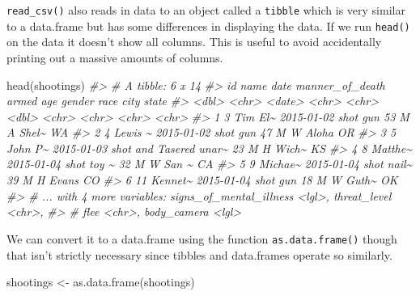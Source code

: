 \documentclass[
]{krantz}
\makeatletter
\newenvironment{Shaded}{\begin{snugshade}}{\end{snugshade}}
\newcommand{\CommentTok}[1]{\textcolor[rgb]{0.37,0.37,0.37}{\textit{#1}}}
\newcommand{\FunctionTok}[1]{\textcolor[rgb]{0,0,0}{#1}}
\newcommand{\NormalTok}[1]{#1}
\newcommand{\OtherTok}[1]{\textcolor[rgb]{0.37,0.37,0.37}{#1}}
\newenvironment{kframe}{%
\medskip{}
\setlength{\fboxsep}{.8em}
 \def\at@end@of@kframe{}%
 \ifinner\ifhmode%
  \def\at@end@of@kframe{\end{minipage}}%
  \begin{minipage}{\columnwidth}%
 \fi\fi%
 \def\FrameCommand##1{\hskip\@totalleftmargin \hskip-\fboxsep
 \colorbox{shadecolor}{##1}\hskip-\fboxsep
     \hskip-\linewidth \hskip-\@totalleftmargin \hskip\columnwidth}%
 \MakeFramed {\advance\hsize-\width
   \@totalleftmargin\z@ \linewidth\hsize
   \@setminipage}}%
 {\par\unskip\endMakeFramed%
 \at@end@of@kframe}
\renewenvironment{Shaded}{\begin{kframe}}{\end{kframe}}
\makeatother
\begin{document}
\texttt{read\_csv()} also reads in data to an object called a \texttt{tibble} which is very similar to a data.frame but has some differences in displaying the data. If we run \texttt{head()} on the data it doesn't show all columns. This is useful to avoid accidentally printing out a massive amounts of columns.

\begin{Shaded}
\begin{Highlighting}[]
\FunctionTok{head}\NormalTok{(shootings)}
\CommentTok{\#\textgreater{} \# A tibble: 6 x 14}
\CommentTok{\#\textgreater{}      id name    date       manner\_of\_death  armed   age gender race  city  state}
\CommentTok{\#\textgreater{}   \textless{}dbl\textgreater{} \textless{}chr\textgreater{}   \textless{}date\textgreater{}     \textless{}chr\textgreater{}            \textless{}chr\textgreater{} \textless{}dbl\textgreater{} \textless{}chr\textgreater{}  \textless{}chr\textgreater{} \textless{}chr\textgreater{} \textless{}chr\textgreater{}}
\CommentTok{\#\textgreater{} 1     3 Tim El\textasciitilde{} 2015{-}01{-}02 shot             gun      53 M      A     Shel\textasciitilde{} WA   }
\CommentTok{\#\textgreater{} 2     4 Lewis \textasciitilde{} 2015{-}01{-}02 shot             gun      47 M      W     Aloha OR   }
\CommentTok{\#\textgreater{} 3     5 John P\textasciitilde{} 2015{-}01{-}03 shot and Tasered unar\textasciitilde{}    23 M      H     Wich\textasciitilde{} KS   }
\CommentTok{\#\textgreater{} 4     8 Matthe\textasciitilde{} 2015{-}01{-}04 shot             toy \textasciitilde{}    32 M      W     San \textasciitilde{} CA   }
\CommentTok{\#\textgreater{} 5     9 Michae\textasciitilde{} 2015{-}01{-}04 shot             nail\textasciitilde{}    39 M      H     Evans CO   }
\CommentTok{\#\textgreater{} 6    11 Kennet\textasciitilde{} 2015{-}01{-}04 shot             gun      18 M      W     Guth\textasciitilde{} OK   }
\CommentTok{\#\textgreater{} \# ... with 4 more variables: signs\_of\_mental\_illness \textless{}lgl\textgreater{}, threat\_level \textless{}chr\textgreater{},}
\CommentTok{\#\textgreater{} \#   flee \textless{}chr\textgreater{}, body\_camera \textless{}lgl\textgreater{}}
\end{Highlighting}
\end{Shaded}

We can convert it to a data.frame using the function \texttt{as.data.frame()} though that isn't strictly necessary since tibbles and data.frames operate so similarly.

\begin{Shaded}
\begin{Highlighting}[]
\NormalTok{shootings }\OtherTok{\textless{}{-}} \FunctionTok{as.data.frame}\NormalTok{(shootings)}
\end{Highlighting}
\end{Shaded}
\end{document}

